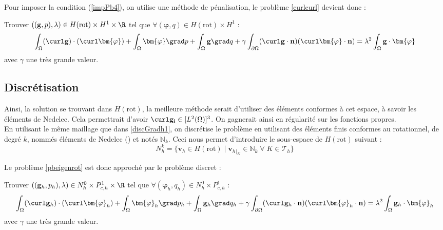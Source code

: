 Pour imposer la condition (\ref{impPb4}), on utilise une méthode de pénalisation, le problème \ref{curlcurl} devient donc :
\begin{pb}\label{pbeigenrot}
Trouver $((\mathbf{g},p),\lambda)\in H(\mathrm{rot}) \times H^1 \times \R$ tel que $\forall (\bm{\varphi},q)\in H(\mathrm{rot}) \times H^1$ :
\begin{equation*}
\int_\Omega (\curl\mathbf{g})\cdot(\curl\bm{\varphi}) + \int_\Omega\bm{\varphi}\grad p + \int_\Omega \mathbf{g}\grad q + \gamma\int_{\partial\Omega}(\curl\mathbf{g}\cdot\mathbf{n})(\curl\bm{\varphi}\cdot\mathbf{n}) = \lambda^2\int_\Omega \mathbf{g}\cdot\bm{\varphi}
\end{equation*}
avec $\gamma$ une très grande valeur.
\end{pb}

\subsection{Discrétisation}
Ainsi, la solution se trouvant dans $H(\mathrm{rot})$, la meilleure méthode serait d'utiliser des éléments conformes à cet espace, à savoir les éléments de Nedelec. Cela permettrait d'avoir $\curl\mathbf{g_i}\in [L^2(\Omega)]^3$. On gagnerait ainsi en régularité sur les fonctions propres.\\

En utilisant le même maillage que dans \ref{discGradh1}, on discrétise le problème en utilisant des éléments finis conformes au rotationnel, de degré $k$, nommés éléments de Nedelec (\cite{Nedelec80,Nedelec86}) et notés $\mathbb{N}_k$. Ceci nous permet d'introduire le sous-espace de $H(\mathrm{rot})$ suivant :
\[ N^k_h = \{ \mathbf{v}_h \in H(\mathrm{rot}) \; |\; \mathbf{v}_h{}_{|_K} \in \mathbb{N}_k\; \forall\; K \in \mathcal{T}_h\}\]

Le problème \ref{pbeigenrot} est donc approché par le problème discret :
\begin{pb}
Trouver $((\mathbf{g}_h,p_h),\lambda)\in N^0_h\times P_{c,h}^1 \times \R$ tel que $\forall  (\bm{\varphi}_h,q_h)\in N^0_h\times P_{c,h}^1$ :
\begin{equation*}
\int_\Omega (\curl\mathbf{g}_h)\cdot(\curl\bm{\varphi}_h) + \int_\Omega\bm{\varphi}_h\grad p_h + \int_\Omega \mathbf{g}_h\grad q_h + \gamma\int_{\partial\Omega}(\curl\mathbf{g}_h\cdot\mathbf{n})(\curl\bm{\varphi}_h\cdot\mathbf{n}) = \lambda^2\int_\Omega \mathbf{g}_h\cdot\bm{\varphi}_h
\end{equation*}
avec $\gamma$ une très grande valeur.
\end{pb}

